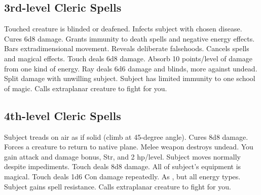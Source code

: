 \subsection{3rd-level Cleric Spells}
\begin{spelllist}
   Touched creature is blinded or deafened.
   Infects subject with chosen disease.
   Cures 6d8 damage.
   Grants immunity to death spells and negative energy effects.
   Bars extradimensional movement.
   Reveals deliberate falsehoods.
   Cancels spells and magical effects.
   Touch deals 6d8 damage.
   Absorb 10 points/level of damage from one kind of energy.
   Ray deals 6d6 damage and blinds, more against undead.
    Split damage with unwilling subject.
   Subject has limited immunity to one school of magic. 
   Calls extraplanar creature to fight for you.
\end{spelllist}

\subsection{4th-level Cleric Spells}
\begin{spelllist}
   Subject treads on air as if solid (climb at 45-degree angle).
   Cures 8d8 damage.
   Forces a creature to return to native plane.
   Melee weapon destroys undead.
   You gain attack and damage bonus,  Str, and 2 hp/level.
   Subject moves normally despite impediments.
   Touch deals 8d8 damage.
   All of subject's equipment is magical.
   Touch deals 1d6 Con damage repeatedly.
   As , but all energy types.
   Subject gains spell resistance.
   Calls extraplanar creature to fight for you.
\end{spelllist}

